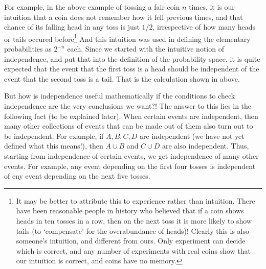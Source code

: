 \documentclass[preprint,  11pt]{amsart}
\theoremstyle{plain} %
\theoremstyle{definition} %
\begin{document}
{{{{{{{{{{{{{For example, in the above example of tossing a fair coin $n$ times, it is our intuition that a coin does not remember how it fell previous times, and that chance of its falling head in any toss is just $1/2$, irrespective of how many heads or tails occured before\footnote{It may be better to attribute this to experience rather than intuition. There have been reasonable people in history who believed that if a coin shows heads in ten tosses in a row, then on the next toss it is more likely to show tails (to `compensate' for the overabundance of heads)! Clearly this is also someone's intuition, and different from ours. Only experiment can decide which is correct, and any number of experiments with real coins show that our intuition is correct, and coins have no memory.} And this intuition was used in defining the elementary probabilities as $2^{-n}$ each. Since we started with the intuitive notion of independence, and put that into the definition of the probability space, it is quite expected that the event that the first toss is a head should be independent of the event that the second toss is a tail. That is the calculation shown in above.

But how is independence useful mathematically if the conditions to check independence are the very conclusions we want?! The answer to this lies in the following fact (to be explained later). When certain events are independent, then many other collections of events that can be made out of them also turn out to be independent. For example, if $A,B,C,D$ are independent (we have not yet defined what this means!), then $A\cup B$ and $C\cup D$ are also independent. Thus, starting from independence of certain events, we get independence of many other events. For example, any event depending on the first four tosses is independent of eny event depending on the next five tosses.


}}}}}}}}}}}}}
\end{document}
